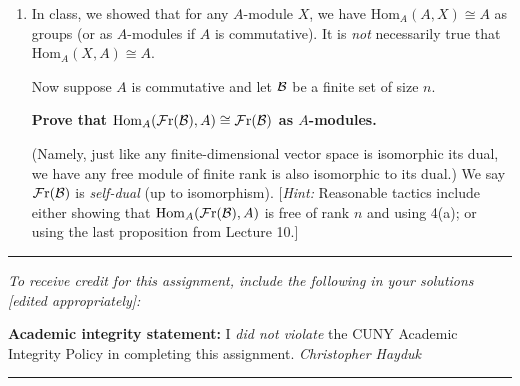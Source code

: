 \documentclass[11pt, reqno]{amsart}
\theoremstyle{plain}
\theoremstyle{definition}
\theoremstyle{example}
\def\Hom{\mathrm{Hom}}
\def\Fr{\mathcal{F}\mathrm{r}}
\begin{document}
\begin{enumerate}[1.]
\begin{enumerate}
\end{enumerate}
\item In class, we showed that for any $A$-module $X$, we have $\Hom_A(A,X) \cong A$ as groups (or as $A$-modules if $A$ is commutative). It is \emph{not} necessarily true that $\Hom_A(X,A) \cong A$. 

\medskip

Now  suppose $A$ is commutative and let $\mathcal{B}$ be a finite set of size $n$. 

\smallskip
\centerline{\textbf{Prove that $\Hom_A(\Fr(\cB), A) \cong \Fr(\cB)$ as $A$-modules.}} (Namely,  just like any finite-dimensional vector space is isomorphic its dual, we have any free module of finite rank is also isomorphic to its dual.) We say $\Fr(\cB)$ is \emph{self-dual} (up to isomorphism). {[\emph{Hint:} Reasonable tactics include either showing that $\Hom_A(\Fr(\cB), A)$ is free  of rank $n$ and using 4(a); or using the last proposition from Lecture 10.]}
\end{enumerate}

\vfill


\hrule
\emph{\small To receive credit for this assignment, include the following in your solutions [edited appropriately]:}

\smallskip

\textbf{Academic integrity statement:} I \emph{did not violate} the CUNY Academic Integrity Policy in completing this assignment. \hfill \emph{Christopher Hayduk}

\medskip
\hrule

\vfill
\end{document}
